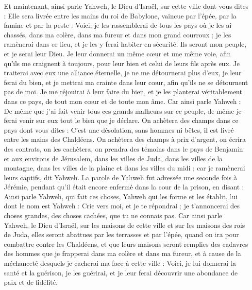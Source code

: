 \begin{multicols}{2}
Et maintenant, ainsi parle Yahweh, le Dieu d'Israël, sur cette ville dont vous dites : Elle sera livrée entre les mains du roi de Babylone, vaincue par l'épée, par la famine et par la peste :
Voici, je les rassemblerai de tous les pays où je les ai chassés, dans ma colère, dans ma fureur et dans mon grand courroux ; je les ramènerai dans ce lieu, et je les y ferai habiter en sécurité.
Ils seront mon peuple, et je serai leur Dieu.
Je leur donnerai un même cœur et une même voie, afin qu'ils me craignent à toujours, pour leur bien et celui de leurs fils après eux.
Je traiterai avec eux une alliance éternelle, je ne me détournerai plus d'eux, je leur ferai du bien, et je mettrai ma crainte dans leur cœur, afin qu'ils ne se détournent pas de moi.
Je me réjouirai à leur faire du bien, et je les planterai véritablement dans ce pays, de tout mon cœur et de toute mon âme.
Car ainsi parle Yahweh : De même que j'ai fait venir tous ces grands malheurs sur ce peuple, de même je ferai venir sur eux tout le bien que je déclare.
On achètera des champs dans ce pays dont vous dites : C'est une désolation, sans hommes ni bêtes, il est livré entre les mains des Chaldéens.
On achètera des champs à prix d'argent, on écrira des contrats, on les cachètera, on prendra des témoins dans le pays de Benjamin et aux environs de Jérusalem, dans les villes de Juda, dans les villes de la montagne, dans les villes de la plaine et dans les villes du midi ; car je ramènerai leurs captifs, dit Yahweh.
\VerseOne{}La parole de Yahweh fut adressée une seconde fois à Jérémie, pendant qu'il était encore enfermé dans la cour de la prison, en disant :
Ainsi parle Yahweh, qui fait ces choses, Yahweh qui les forme et les établit, lui dont le nom est Yahweh :
Crie vers moi, et je te répondrai ; je t'annoncerai des choses grandes, des choses cachées, que tu ne connais pas.
Car ainsi parle Yahweh, le Dieu d'Israël, sur les maisons de cette ville et sur les maisons des rois de Juda, elles seront abattues par les terrasses et par l'épée,
quand on ira pour combattre contre les Chaldéens, et que leurs maisons seront remplies des cadavres des hommes que je frapperai dans ma colère et dans ma fureur, et à cause de la méchanceté desquels je cacherai ma face à cette ville :
Voici, je lui donnerai la santé et la guérison, je les guérirai, et je leur ferai découvrir une abondance de paix et de fidélité.

\end{multicols}
